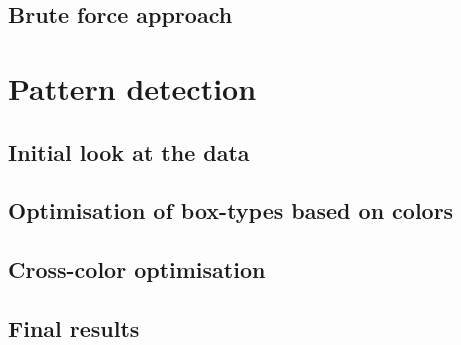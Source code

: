\documentclass{beamer}
\begin{document}
\subsection{Brute force approach}



\section{Pattern detection}


\subsection{Initial look at the data}


\subsection{Optimisation of box-types based on colors}


\subsection{Cross-color optimisation}


\subsection{Final results}

\end{document}
